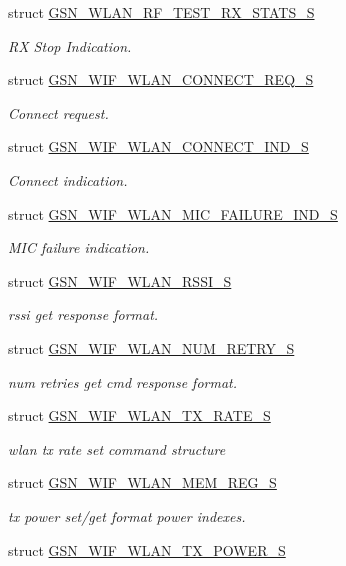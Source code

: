 \begin{DoxyCompactItemize}
struct \hyperlink{a00419}{GSN\_\-WLAN\_\-RF\_\-TEST\_\-RX\_\-STATS\_\-S}
\begin{DoxyCompactList}\small\item\em RX Stop Indication. \end{DoxyCompactList}\item 
struct \hyperlink{a00374}{GSN\_\-WIF\_\-WLAN\_\-CONNECT\_\-REQ\_\-S}
\begin{DoxyCompactList}\small\item\em Connect request. \end{DoxyCompactList}\item 
struct \hyperlink{a00373}{GSN\_\-WIF\_\-WLAN\_\-CONNECT\_\-IND\_\-S}
\begin{DoxyCompactList}\small\item\em Connect indication. \end{DoxyCompactList}\item 
struct \hyperlink{a00391}{GSN\_\-WIF\_\-WLAN\_\-MIC\_\-FAILURE\_\-IND\_\-S}
\begin{DoxyCompactList}\small\item\em MIC failure indication. \end{DoxyCompactList}\item 
struct \hyperlink{a00395}{GSN\_\-WIF\_\-WLAN\_\-RSSI\_\-S}
\begin{DoxyCompactList}\small\item\em rssi get response format. \end{DoxyCompactList}\item 
struct \hyperlink{a00392}{GSN\_\-WIF\_\-WLAN\_\-NUM\_\-RETRY\_\-S}
\begin{DoxyCompactList}\small\item\em num retries get cmd response format. \end{DoxyCompactList}\item 
struct \hyperlink{a00409}{GSN\_\-WIF\_\-WLAN\_\-TX\_\-RATE\_\-S}
\begin{DoxyCompactList}\small\item\em wlan tx rate set command structure \end{DoxyCompactList}\item 
struct \hyperlink{a00390}{GSN\_\-WIF\_\-WLAN\_\-MEM\_\-REG\_\-S}
\begin{DoxyCompactList}\small\item\em tx power set/get format power indexes. \end{DoxyCompactList}\item 
struct \hyperlink{a00408}{GSN\_\-WIF\_\-WLAN\_\-TX\_\-POWER\_\-S}

\end{DoxyCompactItemize}
